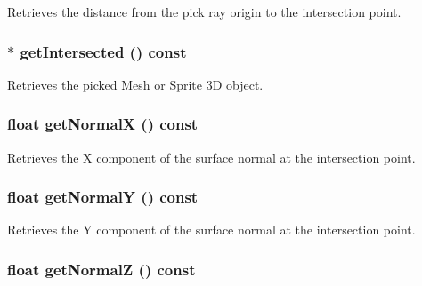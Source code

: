 Retrieves the distance from the pick ray origin to the intersection point. \hypertarget{classm3g_1_1RayIntersection_cbf90cea6001c33cc03b5a737b312f62}{
\subsubsection[{getIntersected}]{ $\ast$ getIntersected () const}}
\label{classm3g_1_1RayIntersection_cbf90cea6001c33cc03b5a737b312f62}


Retrieves the picked \hyperlink{classm3g_1_1Mesh}{Mesh} or Sprite 3D object. \hypertarget{classm3g_1_1RayIntersection_0ee7a8fab5e001b131bd3109da8af7fa}{
\subsubsection[{getNormalX}]{\setlength{\rightskip}{0pt plus 5cm}float getNormalX () const}}
\label{classm3g_1_1RayIntersection_0ee7a8fab5e001b131bd3109da8af7fa}


Retrieves the X component of the surface normal at the intersection point. \hypertarget{classm3g_1_1RayIntersection_1e05e3b3e8d6b46462812e4713a63d18}{
\subsubsection[{getNormalY}]{\setlength{\rightskip}{0pt plus 5cm}float getNormalY () const}}
\label{classm3g_1_1RayIntersection_1e05e3b3e8d6b46462812e4713a63d18}


Retrieves the Y component of the surface normal at the intersection point. \hypertarget{classm3g_1_1RayIntersection_5d0569741397401f53b776f16d08f5c3}{
\subsubsection[{getNormalZ}]{\setlength{\rightskip}{0pt plus 5cm}float getNormalZ () const}}
\label{classm3g_1_1RayIntersection_5d0569741397401f53b776f16d08f5c3}



